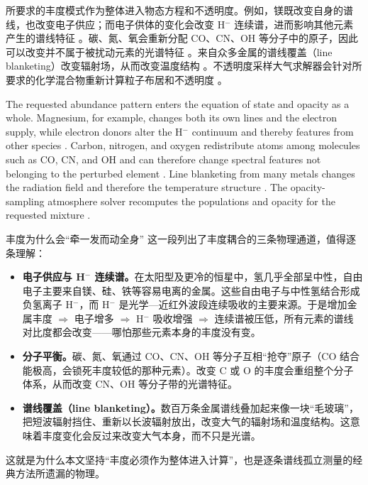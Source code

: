 所要求的丰度模式作为整体进入物态方程和不透明度。例如，镁既改变自身的谱线，也改变电子供应；而电子供体的变化会改变 H$^-$ 连续谱，进而影响其他元素产生的谱线特征 \citep{John1988,Meszaros2012,Matsuno2024}。碳、氮、氧会重新分配 CO、CN、OH 等分子中的原子，因此可以改变并不属于被扰动元素的光谱特征 \citep{Tsuji1973,Ting2018Oxygen}。来自众多金属的谱线覆盖（line blanketing）改变辐射场，从而改变温度结构 \citep{Gustafsson2008}。不透明度采样大气求解器会针对所要求的化学混合物重新计算粒子布居和不透明度 \citep{Kurucz1996}。

\begin{EN}
The requested abundance pattern enters the equation of state and opacity as a
whole. Magnesium, for example, changes both its own lines and the electron
supply, while electron donors alter the H$^-$ continuum and thereby features
from other species \citep{John1988,Meszaros2012,Matsuno2024}. Carbon, nitrogen,
and oxygen redistribute atoms among molecules such as CO, CN, and OH and can
therefore change spectral features not belonging to the perturbed element
\citep{Tsuji1973,Ting2018Oxygen}. Line blanketing from many metals changes the
radiation field and therefore the temperature structure
\citep{Gustafsson2008}. The opacity-sampling atmosphere solver recomputes the
populations and opacity for the requested mixture \citep{Kurucz1996}.
\end{EN}

\begin{physbox}{丰度为什么会“牵一发而动全身”}
这一段列出了丰度耦合的三条物理通道，值得逐条理解：
\begin{itemize}
\item \textbf{电子供应与 H$^-$ 连续谱。}在太阳型及更冷的恒星中，氢几乎全部呈中性，自由电子主要来自镁、硅、铁等容易电离的金属。这些自由电子与中性氢结合形成负氢离子 H$^-$，而 H$^-$ 是光学—近红外波段连续吸收的主要来源。于是增加金属丰度 $\Rightarrow$ 电子增多 $\Rightarrow$ H$^-$ 吸收增强 $\Rightarrow$ 连续谱被压低，所有元素的谱线对比度都会改变——哪怕那些元素本身的丰度没有变。
\item \textbf{分子平衡。}碳、氮、氧通过 CO、CN、OH 等分子互相“抢夺”原子（CO 结合能极高，会锁死丰度较低的那种元素）。改变 C 或 O 的丰度会重组整个分子体系，从而改变 CN、OH 等分子带的光谱特征。
\item \textbf{谱线覆盖（line blanketing）。}数百万条金属谱线叠加起来像一块“毛玻璃”，把短波辐射挡住、重新以长波辐射放出，改变大气的辐射场和温度结构。这意味着丰度变化会反过来改变大气本身，而不只是光谱。
\end{itemize}
这就是为什么本文坚持“丰度必须作为整体进入计算”，也是逐条谱线孤立测量的经典方法所遗漏的物理。
\end{physbox}

